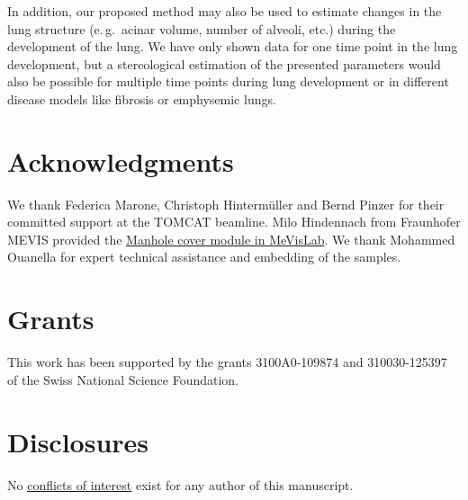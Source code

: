 \documentclass[a4paper,DIV=calc,abstract,english]{scrartcl}
\newcommand{\eg}{e.\,g.\ }
\begin{document}
In addition, our proposed method may also be used to estimate changes in the lung structure (\eg acinar volume, number of alveoli, etc.) during the development of the lung.
We have only shown data for one time point in the lung development, but a stereological estimation of the presented parameters would also be possible for multiple time points during lung development or in different disease models like fibrosis or emphysemic lungs.

\section{Acknowledgments}
We thank Federica Marone, Christoph Hintermüller and Bernd Pinzer for their committed support at the TOMCAT beamline.
Milo Hindennach from Fraunhofer MEVIS provided the \href{http://www.mevis-research.de/cgi-bin/discus/board-auth.cgi?lm=1282233250&file=/839/11760.html}{Manhole cover module in MeVisLab}.
We thank Mohammed Ouanella for expert technical assistance and embedding of the samples.

\section{Grants}
This work has been supported by the grants 3100A0-109874 and 310030-125397 of the Swiss National Science Foundation.

\section{Disclosures}
No \href{http://www.the-aps.org/mm/Publications/Preparing-Your-Manuscript#conflicts}{conflicts of interest} exist for any author of this manuscript.

\ifJCS
	\singlespacing
\else
\fi



\end{document}
